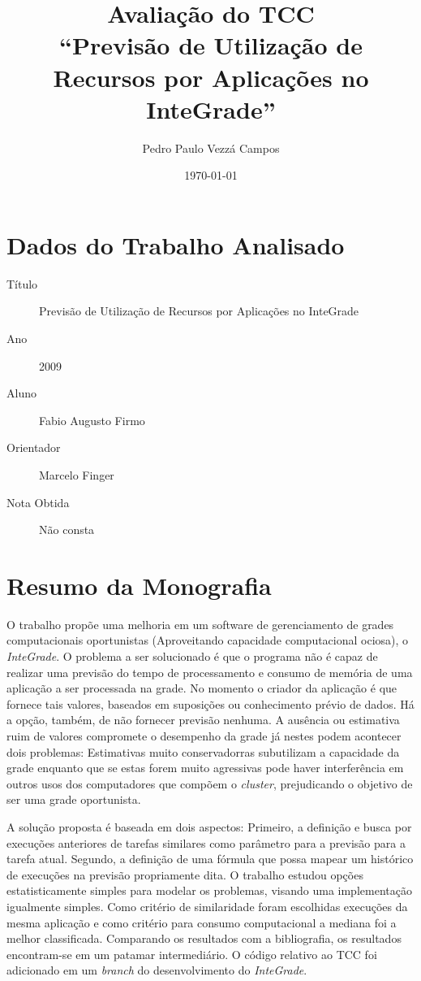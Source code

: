 \documentclass{article}
\begin{document}
\author{Pedro Paulo Vezzá Campos}
\title{Avaliação do TCC \\ ``Previsão de Utilização de Recursos por Aplicações no InteGrade''}
\date{\today}
\maketitle

\section{Dados do Trabalho Analisado}
	\begin{description}
		\item[Título] Previsão de Utilização de Recursos por Aplicações no InteGrade
		\item[Ano] 2009
		\item[Aluno] Fabio Augusto Firmo
		\item[Orientador] Marcelo Finger
		\item[Nota Obtida] Não consta
	\end{description}

\section{Resumo da Monografia}
	O trabalho propõe uma melhoria em um software de gerenciamento de grades computacionais oportunistas (Aproveitando capacidade computacional ociosa), o \emph{InteGrade}. O problema a ser solucionado é que o programa não é capaz de realizar uma previsão do tempo de processamento e consumo de memória de uma aplicação a ser processada na grade. No momento o criador da aplicação é que fornece tais valores, baseados em suposições ou conhecimento prévio de dados. Há a opção, também, de não fornecer previsão nenhuma. A ausência ou estimativa ruim de valores compromete o desempenho da grade já nestes podem acontecer dois problemas: Estimativas muito conservadorras subutilizam a capacidade da grade enquanto que se estas forem muito agressivas pode haver interferência em outros usos dos computadores que compõem o \emph{cluster}, prejudicando o objetivo de ser uma grade oportunista.

	A solução proposta é baseada em dois aspectos: Primeiro, a definição e busca por execuções anteriores de tarefas similares como parâmetro para a previsão para a tarefa atual. Segundo, a definição de uma fórmula que possa mapear um histórico de execuções na previsão propriamente dita. O trabalho estudou opções estatisticamente simples para modelar os problemas, visando uma implementação igualmente simples. Como critério de similaridade foram escolhidas execuções da mesma aplicação e como critério para consumo computacional a mediana foi a melhor classificada. Comparando os resultados com a bibliografia, os resultados encontram-se em um patamar intermediário. O código relativo ao TCC foi adicionado em um \emph{branch} do desenvolvimento do \emph{InteGrade}.
	
\end{document}
